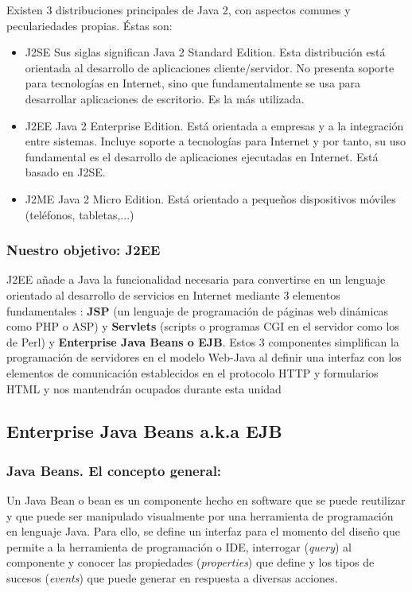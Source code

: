 \documentclass{apuntes}
\begin{document}
Existen 3 distribuciones principales de Java 2, con aspectos comunes y peculariedades propias. Éstas son:
\begin{itemize}
\item J2SE
Sus siglas significan Java 2 Standard Edition.
Esta distribución está orientada al desarrollo de aplicaciones cliente/servidor. No presenta soporte para tecnologías en Internet, sino que fundamentalmente se usa para desarrollar aplicaciones de escritorio. Es la más utilizada.
\item J2EE 
Java 2 Enterprise Edition. Está orientada a empresas y a la integración entre sistemas. Incluye soporte a tecnologías para Internet y por tanto, su uso fundamental es el desarrollo de aplicaciones ejecutadas en Internet. Está  basado en J2SE.
\item J2ME 
Java 2 Micro Edition. Está orientado a pequeños dispositivos móviles (teléfonos, tabletas,...)
\end{itemize}

\subsubsection{Nuestro objetivo: J2EE}
J2EE añade a Java la funcionalidad necesaria para convertirse en un lenguaje orientado al desarrollo de servicios en Internet mediante 3 elementos fundamentales : \textbf {JSP} (un lenguaje de programación de páginas web dinámicas como PHP o ASP) y \textbf{Servlets} (scripts o programas CGI en el servidor como los de Perl) y \textbf{Enterprise Java Beans o EJB}.
Estos 3 componentes simplifican la programación de servidores en el modelo Web-Java al definir una interfaz con los elementos de comunicación establecidos en el protocolo HTTP y formularios HTML y nos mantendrán ocupados durante esta unidad
\subsection{Enterprise Java Beans a.k.a EJB}
\subsubsection{Java Beans. El concepto general:}

Un Java Bean o bean es un componente hecho en software que se puede reutilizar y que puede ser manipulado visualmente por una herramienta de programación en lenguaje Java.
Para ello, se define un interfaz para el momento del diseño que permite a la herramienta de programación o IDE, interrogar (\emph{query}) al componente y conocer las propiedades (\emph{properties}) que define y los tipos de sucesos (\emph{events}) que puede generar en respuesta a diversas acciones.
\end{document}
